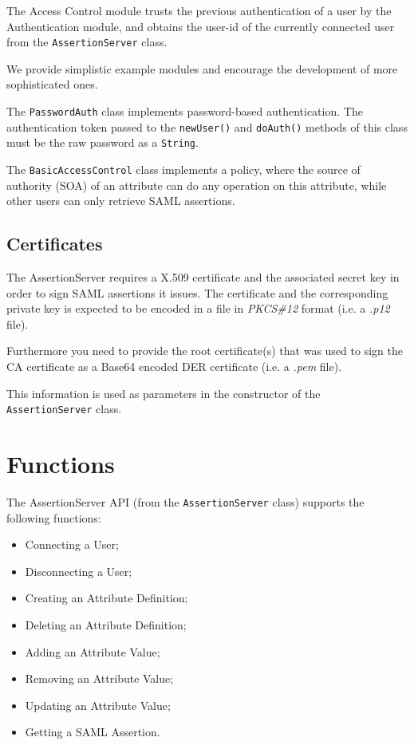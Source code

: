 \documentclass[10pt,a4paper]{article}
\begin{document}
The Access Control module trusts the previous authentication of a user by the
Authentication module, and obtains the user-id of the currently connected user 
from the \texttt{AssertionServer} class. 


We provide simplistic example modules and encourage the development of more 
sophisticated ones. 

The \texttt{PasswordAuth} class implements password-based authentication. 
The authentication token passed to the \texttt{newUser()} and \texttt{doAuth()}
methods of this class must be the raw password as
a \texttt{String}.

The \texttt{BasicAccessControl} class implements a policy, where the 
source of authority (SOA) of an attribute can do any operation on this
attribute, while other users can only retrieve SAML assertions.

\subsection{Certificates}
The AssertionServer requires a X.509 certificate and the associated secret key
in order to sign SAML assertions it issues. The certificate and the 
corresponding private key is expected to be encoded in a file in 
\emph{PKCS\#12} format (i.e. a \emph{.p12} file).

Furthermore you need to provide the root certificate(s) that was used to sign
the CA certificate as a Base64 encoded DER certificate (i.e. a \emph{.pem} 
file).

This information is used as parameters in the constructor of the 
\texttt{AssertionServer} class.

\section{Functions}
The AssertionServer API (from the \texttt{AssertionServer} class) supports the
following functions:

\begin{itemize}
  \item Connecting a User;
  \item Disconnecting a User;
  \item Creating an Attribute Definition;
  \item Deleting an Attribute Definition;
  \item Adding an Attribute Value;
  \item Removing an Attribute Value;
  \item Updating an Attribute Value;
  \item Getting a SAML Assertion.
\end{itemize}
\end{document}
